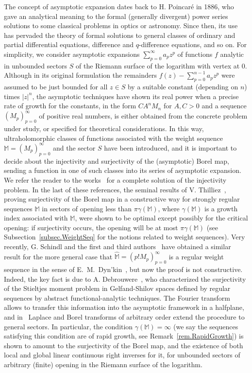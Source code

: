 \documentclass[12pt,leqno]{amsart}
\theoremstyle{plain}
\theoremstyle{definition}
\numberwithin{equation}{section}
\def\M{\mathbb{M}}
\newcommand{\hM}{\widehat{\M}}
\begin{document}
The concept of asymptotic expansion dates back to H. Poincar\'e in 1886, who gave an analytical meaning to the formal (generally divergent) power series solutions to some classical problems in optics or astronomy. Since then, its use has pervaded the theory of formal solutions to general classes of ordinary and partial differential equations, difference and $q$-difference equations, and so on.
For simplicity, we consider asymptotic expansions $\sum_{p=0}^\infty a_pz^p$ of functions $f$ analytic in unbounded sectors $S$ of the Riemann surface of the logarithm with vertex at 0. Although in its original formulation the remainders $f(z)-\sum_{p=0}^{n-1}a_pz^p$ were assumed to be just bounded for all $z\in S$ by a suitable constant (depending on $n$) times $|z|^n$, the asymptotic techniques have shown its real power when a precise rate of growth for the constants, in the form $CA^nM_n$ for $A,C>0$ and a sequence $(M_p)_{p=0}^\infty$ of positive real numbers, is either obtained from the concrete problem under study, or specified for theoretical considerations. In this way, ultraholomorphic classes of functions associated with the weight sequence $\M=(M_p)_{p=0}^\infty$ and the sector $S$ have been introduced, and it is important to decide about the injectivity and surjectivity of the (asymptotic) Borel map,  sending a function in one of such classes into its series of asymptotic expansion. We refer the reader to the works~\cite{Mandelbrojt,Salinas,JimenezSanzSchindlInjectSurject} for
a complete solution of the injectivity problem. In the last of these references, the seminal results of V. Thilliez~\cite{Thilliez03}, proving surjectivity of the Borel map in a constructive way for strongly regular sequences $\M$ in sectors of opening less than $\pi\gamma(\M)$, where $\gamma(\M)$ is a growth index associated with $\M$, were shown to be optimal except possibly for the critical opening: if surjectivity occurs, the opening will be at most $\pi\gamma(\M)$ (see Subsection~\ref{subsec.WeightSeq} for the notions related to weight sequences). Very recently, G. Schindl and the first and third authors~\cite{JimenezSanzSchindlSurjectDc} have obtained a similar result
for the more general case that $\hM=(p!M_p)_{p=0}^\infty$ is a regular weight sequence in the sense of E.~M.~Dyn'kin~\cite{Dynkin80}, but now the proof is not constructive. Indeed, the key fact is due to A. Debrouwere~\cite{momentsdebrouwere}, who characterized the surjectivity of the Stieltjes moment problem in Gelfand-Shilov spaces defined by regular sequences by abstract functional-analytic techniques. The Fourier transform allows to transfer this information into the asymptotic framework in a halfplane, and in~\cite{JimenezSanzSchindlSurjectDc} Laplace and Borel transforms of arbitrary order extend the procedure to general sectors. In particular, the condition $\gamma(\M)=\infty$ (we say the sequences satisfying this condition are of rapid growth, see Remark~\ref{rem.RapidGrowth}) is shown to amount to the surjectivity of the Borel map, and the existence of both local and global linear continuous right inverses for it, for unbounded sectors of arbitrary (finite) opening in the Riemann surface of the logarithm.
\end{document}
